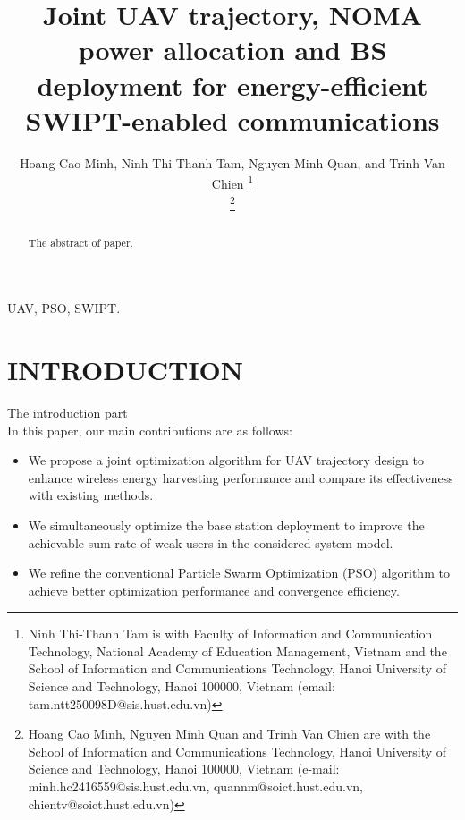 \documentclass[conference]{IEEEtran}
\begin{document}
\title{\huge Joint UAV trajectory, NOMA power allocation and BS deployment for energy-efficient SWIPT-enabled communications
}

\author{Hoang Cao Minh, Ninh Thi Thanh Tam,  Nguyen Minh Quan, and Trinh Van Chien
\thanks{Ninh Thi-Thanh Tam is with Faculty of Information and Communication Technology, National Academy of Education Management, Vietnam and the School of Information and Communications Technology, Hanoi University of Science and Technology, Hanoi 100000, Vietnam (email: tam.ntt250098D@sis.hust.edu.vn)}

\thanks{ Hoang Cao Minh, Nguyen Minh Quan and Trinh Van Chien are with the School of Information and Communications Technology, Hanoi University of Science and Technology, Hanoi 100000, Vietnam (e-mail: minh.hc2416559@sis.hust.edu.vn, quannm@soict.hust.edu.vn,  chientv@soict.hust.edu.vn)}
}

\maketitle
\begin{abstract} The abstract of paper.
\end{abstract}
\begin{IEEEkeywords} UAV, PSO, SWIPT.
\end{IEEEkeywords}

\thispagestyle{empty}
\section{INTRODUCTION}
\label{sec:introduction}
The introduction part\\
In this paper, our main contributions are as follows:
\begin{itemize}
    \item We propose a joint optimization algorithm for UAV trajectory design to enhance wireless energy harvesting performance and compare its effectiveness with existing methods.
    \item We simultaneously optimize the base station deployment to improve the achievable sum rate of weak users in the considered system model.
    \item We refine the conventional Particle Swarm Optimization (PSO) algorithm to achieve better optimization performance and convergence efficiency.
\end{itemize}
\end{document}

